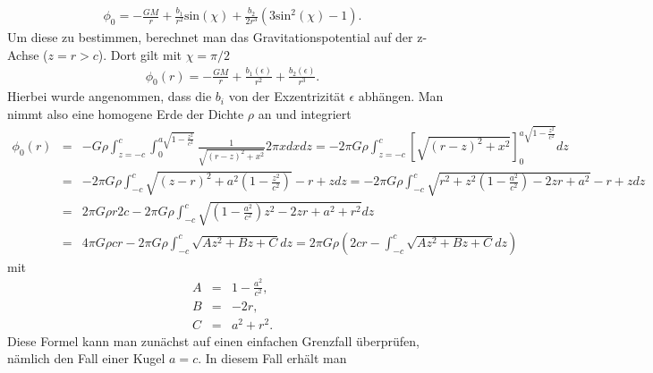 \documentclass{book}
\renewcommand{\sin}{\text{sin}}
\begin{document}
%
\begin{eqnarray}
\phi_0 = -\frac{GM}{r} + \frac{b_1}{r^2}\sin\left(\chi\right) + \frac{b_2}{2r^3}\left(3\sin^2\left(\chi\right) - 1\right).
\end{eqnarray}
%
Um diese zu bestimmen, berechnet man das Gravitationspotential auf der z-Achse ($z = r> c$). Dort gilt mit $\chi = \pi/2$
%
\begin{eqnarray}
\phi_0\left(r\right) = -\frac{GM}{r} + \frac{b_1\left(\epsilon\right)}{r^2} + \frac{b_2\left(\epsilon\right)}{r^3}.\label{eq:grav_z_dritte_ordnung}
\end{eqnarray}
%
Hierbei wurde angenommen, dass die $b_i$ von der Exzentrizität $\epsilon$ abhängen. Man nimmt also eine homogene Erde der Dichte $\rho$ an und integriert
%
\begin{eqnarray}
\phi_0\left(r\right) & = & -G\rho\int_{z = -c}^{c}\int_{0}^{a\sqrt{1 - \frac{z^2}{c^2}}}\frac{1}{\sqrt{\left(r - z\right)^2 + x^2}}2\pi xdxdz = -2\pi G\rho\int_{z = -c}^{c}\left[\sqrt{\left(r - z\right)^2 + x^2}\right]_0^{a\sqrt{1 - \frac{z^2}{c^2}}}dz\nonumber\\
& = & -2\pi G\rho\int_{ - c}^c\sqrt{\left(z - r\right)^2 + a^2\left(1 - \frac{z^2}{c^2}\right)} - r + zdz = -2\pi G\rho\int_{ - c}^{c}\sqrt{r^2 + z^2\left(1 - \frac{a^2}{c^2}\right) - 2zr + a^2} - r + zdz\nonumber\\
& = & 2\pi G\rho r2c - 2\pi G\rho\int_{ - c}^{c}\sqrt{\left(1 - \frac{a^2}{c^2}\right)z^2 - 2zr + a^2 + r^2}dz\nonumber\\
& = & 4\pi G\rho cr - 2\pi G\rho\int_{ - c}^{c}\sqrt{Az^2 + Bz + C}dz = 2\pi G\rho\left(2cr - \int_{ - c}^{c}\sqrt{Az^2 + Bz + C}dz\right)
\end{eqnarray}
%
mit
%
\begin{eqnarray}
A & = & 1 - \frac{a^2}{c^2},\\
B & = & -2r,\\
C & = & a^2 + r^2.
\end{eqnarray}
%
Diese Formel kann man zunächst auf einen einfachen Grenzfall überprüfen, nämlich den Fall einer Kugel $a = c$. In diesem Fall erhält man
%
\end{document}
